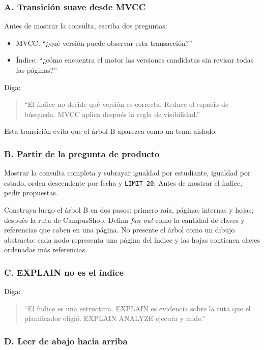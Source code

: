 \documentclass[variant=docente,cover=institutional,mode=screen]{ua-engineering-v6-article}
\begin{document}
\subsubsection*{A. Transición suave desde MVCC}

Antes de mostrar la consulta, escriba dos preguntas:

\begin{itemize}
\item MVCC: ``¿qué versión puede observar esta transacción?''
\item Índice: ``¿cómo encuentra el motor las versiones candidatas sin revisar todas las páginas?''
\end{itemize}

Diga:

\begin{quote}
``El índice no decide qué versión es correcta. Reduce el espacio de búsqueda. MVCC aplica después la regla de visibilidad.''
\end{quote}

Esta transición evita que el árbol B aparezca como un tema aislado.

\subsubsection*{B. Partir de la pregunta de producto}

Mostrar la consulta completa y subrayar igualdad por estudiante, igualdad por estado, orden descendente por fecha y \texttt{LIMIT 20}. Antes de mostrar el índice, pedir propuestas.

Construya luego el árbol B en dos pasos: primero raíz, páginas internas y hojas; después la ruta de CampusShop. Defina \emph{fan-out} como la cantidad de claves y referencias que caben en una página. No presente el árbol como un dibujo abstracto: cada nodo representa una página del índice y las hojas contienen claves ordenadas más referencias.

\subsubsection*{C. EXPLAIN no es el índice}

Diga:

\begin{quote}
``El índice es una estructura. EXPLAIN es evidencia sobre la ruta que el planificador eligió. EXPLAIN ANALYZE ejecuta y mide.''
\end{quote}

\subsubsection*{D. Leer de abajo hacia arriba}
\end{document}
